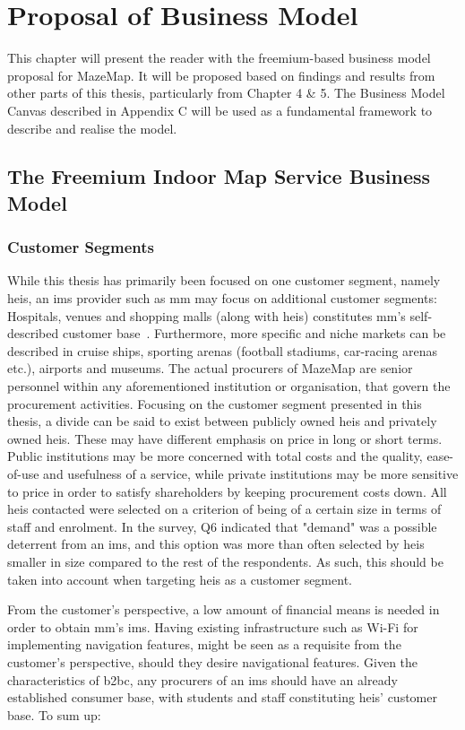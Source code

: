 \chapter{Proposal of Business Model}
This chapter will present the reader with the freemium-based business model proposal for MazeMap. It will be proposed based on findings and results from other parts of this thesis, particularly from Chapter 4 \& 5. The Business Model Canvas described in Appendix C will be used as a fundamental framework to describe and realise the model.


\section{The Freemium Indoor Map Service Business Model}
\subsection{Customer Segments}
While this thesis has primarily been focused on one customer segment, namely \glspl{hei}, an \gls{ims} provider such as \gls{mm} may focus on additional customer segments: Hospitals, venues and shopping malls (along with \glspl{hei}) constitutes \gls{mm}'s self-described customer base~\cite{mazemap}. Furthermore, more specific and niche markets can be described in cruise ships, sporting arenas (football stadiums, car-racing arenas etc.), airports and museums. The actual procurers of MazeMap are senior personnel within any aforementioned institution or organisation, that govern the procurement activities. Focusing on the customer segment presented in this thesis, a divide can be said to exist between publicly owned \glspl{hei} and privately owned \glspl{hei}. These may have different emphasis on price in long or short terms. Public institutions may be more concerned with total costs and the quality, ease-of-use and usefulness of a service, while private institutions may be more sensitive to price in order to satisfy shareholders by keeping procurement costs down. All \glspl{hei} contacted were selected on a criterion of being of a certain size in terms of staff and enrolment. In the survey, Q6 indicated that "demand" was a possible deterrent from an \gls{ims}, and this option was more than often selected by \glspl{hei} smaller in size compared to the rest of the respondents. As such, this should be taken into account when targeting \glspl{hei} as a customer segment.

\newpage
From the customer's perspective, a low amount of financial means is needed in order to obtain \gls{mm}'s \gls{ims}. Having existing infrastructure such as Wi-Fi for implementing navigation features, might be seen as a requisite from the customer's perspective, should they desire navigational features. Given the characteristics of \gls{b2bc}, any procurers of an \gls{ims} should have an already established consumer base, with students and staff constituting \glspl{hei}' customer base. To sum up:


